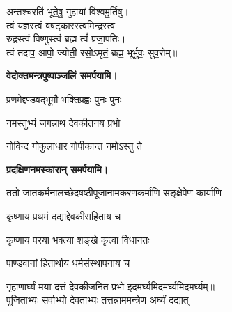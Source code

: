\begin{center}
अन्तश्चरति॑ भूते॒षु॒ गुहायां वि॑श्वमू॒र्तिषु। \\
त्वं यज्ञस्त्वं वषट्कारस्त्वमिन्द्रस्त्व\\ रुद्रस्त्वं विष्णुस्त्वं ब्रह्म त्वं॑ प्रजा॒पतिः। \\
त्वं त॑दाप॒ आपो॒ ज्योती॒ रसो॒ऽमृतं॒ ब्रह्म॒ भूर्भुवः॒ सुव॒रोम्॥\medskip

\textbf{\devAya{} वेदोक्तमन्त्रपुष्पाञ्जलिं समर्पयामि।}
\medskip

{प्रणमेद्दण्डवद्भूमौ भक्तिप्रह्वः पुनः पुनः}
\medskip

{नमस्तुभ्यं जगन्नाथ देवकीतनय प्रभो}

{गोविन्द गोकुलाधार गोपीकान्त नमोऽस्तु ते}

\textbf{\devAya{} प्रदक्षिणनमस्कारान् समर्पयामि।}
\medskip




ततो जातकर्मनालच्छेदषष्ठीपूजानामकरणकर्माणि सङ्क्षेपेण कार्याणि।


{कृष्णाय प्रथमं दद्याद्देवकीसहिताय च}

{कृष्णाय परया भक्त्या शङ्खे कृत्वा विधानतः}
\medskip

{पाण्डवानां हितार्थाय धर्मसंस्थापनाय च}

{गृहाणार्घ्यं मया दत्तं देवकीजनित प्रभो}
\devAya{} इदमर्घ्यमिदमर्घ्यमिदमर्घ्यम्॥\medskip
\medskip\\
पूजिताभ्यः सर्वाभ्यो देवताभ्यः तत्तन्नाममन्त्रेण अर्घ्यं दद्यात् \\


\end{center}

